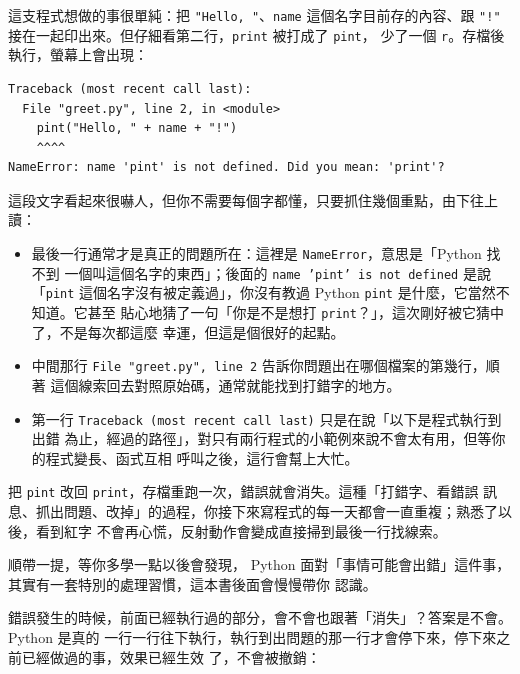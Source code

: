 這支程式想做的事很單純：把 \texttt{"Hello, "}、\texttt{name} 這個名字目前存的內容、跟
\texttt{"!"} 接在一起印出來。但仔細看第二行，\texttt{print} 被打成了 \texttt{pint}，
少了一個 \texttt{r}。存檔後執行，螢幕上會出現：

\begin{verbatim}
Traceback (most recent call last):
  File "greet.py", line 2, in <module>
    pint("Hello, " + name + "!")
    ^^^^
NameError: name 'pint' is not defined. Did you mean: 'print'?
\end{verbatim}

這段文字看起來很嚇人，但你不需要每個字都懂，只要抓住幾個重點，由下往上讀：

\begin{itemize}
\item 最後一行通常才是真正的問題所在：這裡是 \texttt{NameError}，意思是「Python 找不到
一個叫這個名字的東西」；後面的 \texttt{name 'pint' is not defined} 是說「\texttt{pint}
這個名字沒有被定義過」，你沒有教過 Python \texttt{pint} 是什麼，它當然不知道。它甚至
貼心地猜了一句「你是不是想打 \texttt{print}？」，這次剛好被它猜中了，不是每次都這麼
幸運，但這是個很好的起點。
\item 中間那行 \texttt{File "greet.py", line 2} 告訴你問題出在哪個檔案的第幾行，順著
這個線索回去對照原始碼，通常就能找到打錯字的地方。
\item {}第一行 \texttt{Traceback (most recent call last)} 只是在說「以下是程式執行到出錯
為止，經過的路徑」，對只有兩行程式的小範例來說不會太有用，但等你的程式變長、函式互相
呼叫之後，這行會幫上大忙。
\end{itemize}


把 \texttt{pint} 改回 \texttt{print}，存檔重跑一次，錯誤就會消失。這種「打錯字、看錯誤
訊息、抓出問題、改掉」的過程，你接下來寫程式的每一天都會一直重複；熟悉了以後，看到紅字
不會再心慌，反射動作會變成直接掃到最後一行找線索。

順帶一提，等你多學一點以後會發現，
Python 面對「事情可能會出錯」這件事，其實有一套特別的處理習慣，這本書後面會慢慢帶你
認識。

錯誤發生的時候，前面已經執行過的部分，會不會也跟著「消失」？答案是不會。Python 是真的
一行一行往下執行，執行到出問題的那一行才會停下來，停下來之前已經做過的事，效果已經生效
了，不會被撤銷：


